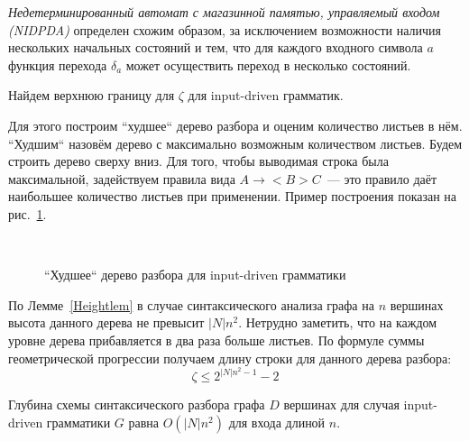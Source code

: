 \textit{Недетерминированный автомат с магазинной памятью, управляемый входом (NIDPDA)} определен схожим образом, за исключением возможности наличия нескольких начальных состояний и тем, что для каждого входного символа $a$ функция перехода $\delta_a$ может осуществить переход в несколько состояний. 

Найдем верхнюю границу для $\zeta$ для input-driven грамматик.

Для этого построим ``худшее`` дерево разбора и оценим количество листьев в нём. ``Худшим`` назовём дерево с максимально возможным количеством листьев. Будем строить дерево сверху вниз. Для того, чтобы выводимая строка была максимальной, задействуем правила вида $A \rightarrow <B>C$~--- это правило даёт наибольшее количество листьев при применении. Пример построения показан на рис.~\ref{IDw}.

\begin{figure}
\centering

 \\
	\caption{``Худшее`` дерево разбора для input-driven грамматики}
\label{IDw}
\end{figure}
По Лемме~\ref{Heightlem} в случае синтаксического анализа графа на $n$ вершинах высота данного дерева не превысит $|N|n^2$. Нетрудно заметить, что на каждом уровне дерева прибавляется в два раза больше листьев. По формуле суммы геометрической прогрессии получаем длину строки для данного дерева разбора:
\begin{equation}
\zeta \le 2^{|N|n^2 - 1} - 2
\end{equation}
\begin{corollaryrus}
Глубина схемы синтаксического разбора графа $D$ вершинах для случая input-driven грамматики $G$ равна $O(|N|n^2)$ для входа длиной $n$.
\end{corollaryrus}


